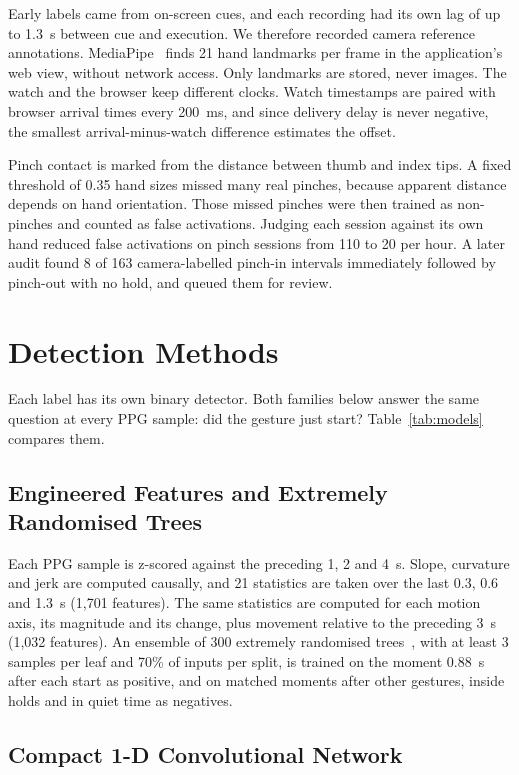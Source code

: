 Early labels came from on-screen cues, and each recording had its own lag of up to 1.3~s between cue and execution. We therefore recorded camera reference annotations. MediaPipe~\cite{mediapipe} finds 21 hand landmarks per frame in the application's web view, without network access. Only landmarks are stored, never images. The watch and the browser keep different clocks. Watch timestamps are paired with browser arrival times every 200~ms, and since delivery delay is never negative, the smallest arrival-minus-watch difference estimates the offset.

Pinch contact is marked from the distance between thumb and index tips. A fixed threshold of 0.35 hand sizes missed many real pinches, because apparent distance depends on hand orientation. Those missed pinches were then trained as non-pinches and counted as false activations. Judging each session against its own hand reduced false activations on pinch sessions from 110 to 20 per hour. A later audit found 8 of 163 camera-labelled pinch-in intervals immediately followed by pinch-out with no hold, and queued them for review.

\section{Detection Methods}\label{sec:methods}

Each label has its own binary detector. Both families below answer the same question at every PPG sample: did the gesture just start? Table~\ref{tab:models} compares them.

\subsection{Engineered Features and Extremely Randomised Trees}

Each PPG sample is z-scored against the preceding 1, 2 and 4~s. Slope, curvature and jerk are computed causally, and 21 statistics are taken over the last 0.3, 0.6 and 1.3~s (1{,}701 features). The same statistics are computed for each motion axis, its magnitude and its change, plus movement relative to the preceding 3~s (1{,}032 features). An ensemble of 300 extremely randomised trees~\cite{geurts2006extra}, with at least 3 samples per leaf and 70\% of inputs per split, is trained on the moment 0.88~s after each start as positive, and on matched moments after other gestures, inside holds and in quiet time as negatives.

\subsection{Compact 1-D Convolutional Network}

